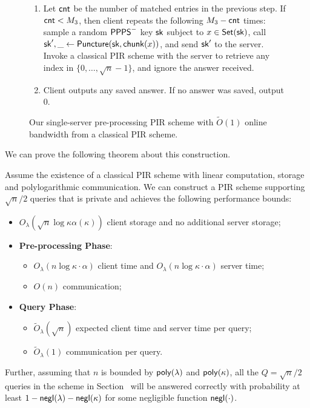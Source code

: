 \begin{figure}[t]
\begin{minipage}{\textwidth}
\begin{mdframed}
\begin{enumerate}[leftmargin=5mm,itemsep=1pt]
\item 
Let ${\sf cnt}$ be the number of matched entries in the previous step. 
If ${\sf cnt}<M_3$, then  
client repeats the following $M_3 - {\sf cnt}$ times:
sample a random ${\sf PPPS}^-$ key $\mathsf{sk}$ subject to $x \in \mathsf{Set}(\mathsf{sk})$, 
call 
$\mathsf{sk}', \_ \leftarrow {\sf Puncture}(\mathsf{sk}, \mathsf{chunk}(x))$, 
and send $\mathsf{sk}'$ to the server. 
Invoke a classical PIR scheme with the server to retrieve
any index in $\{0, \ldots, \sqrt{n}-1\}$, and ignore the answer 
received.
\item 
Client outputs any saved answer. If no answer was saved, output $0$.
            \end{enumerate}
        \end{mdframed}
    \end{minipage}
    \caption{
Our single-server pre-processing PIR scheme
with $\widetilde{O}(1)$ online bandwidth from a classical PIR scheme.
}
    \label{fig:1server-polylog}
\end{figure}

We can prove the following theorem about this construction. 
\begin{theorem}
    Assume the existence of a classical PIR scheme with linear computation, storage and polylogarithmic communication. We can construct a PIR scheme supporting $\sqrt{n}/2$ queries that is private and achieves the following performance bounds:
    \begin{itemize}
        \item $O_\lambda(\sqrt{n}\log \kappa \alpha(\kappa))$ client storage and no additional server storage;
        \item \textbf{Pre-processing Phase}:
        \begin{itemize}
            \item $O_\lambda(n \log\kappa \cdot \alpha)$ client time and ${O}_\lambda(n\log \kappa \cdot \alpha)$ server time;
            \item $O(n)$ communication;
        \end{itemize}
        \item \textbf{Query Phase}:
        \begin{itemize}
            \item $\widetilde{O}_\lambda(\sqrt{n})$ expected client time and server time per query; 
            \item $\widetilde{O}_\lambda(1)$ communication per query.
        \end{itemize}
    \end{itemize} 
    Further, assuming that $n$ is bounded by $\mathsf{poly}(\lambda)$ and $\mathsf{poly}(\kappa)$, all the $Q= \sqrt{n}/2$ queries in the scheme in Section~ will be answered correctly with probability at least $1-\mathsf{negl}(\lambda)-\mathsf{negl}(\kappa)$ for some negligible function $\mathsf{negl}(\cdot)$.
\end{theorem}

